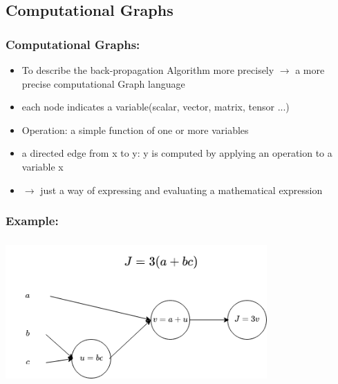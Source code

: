 \documentclass{beamer}
\begin{document}
\subsection{Computational Graphs}
\begin{frame}
	\frametitle{Computational Graphs:}
	\begin{itemize}
		\item To describe the back-propagation Algorithm more precisely $\rightarrow$ a more precise computational Graph language
		\pause
		\item each node indicates a variable(scalar, vector, matrix, tensor ...)
		\item Operation: a simple function of one or more variables
		\item a directed edge from x to y: y is computed by applying an operation to a variable x
			\pause 
		\item $\rightarrow$ just a way of expressing and evaluating a mathematical expression
	\end{itemize}
\end{frame}
\begin{frame}
	\frametitle{Example:}
	\center
	\includegraphics[width=100mm, height= 55mm]{comp_graph.png}
	
\end{frame}
\end{document}
